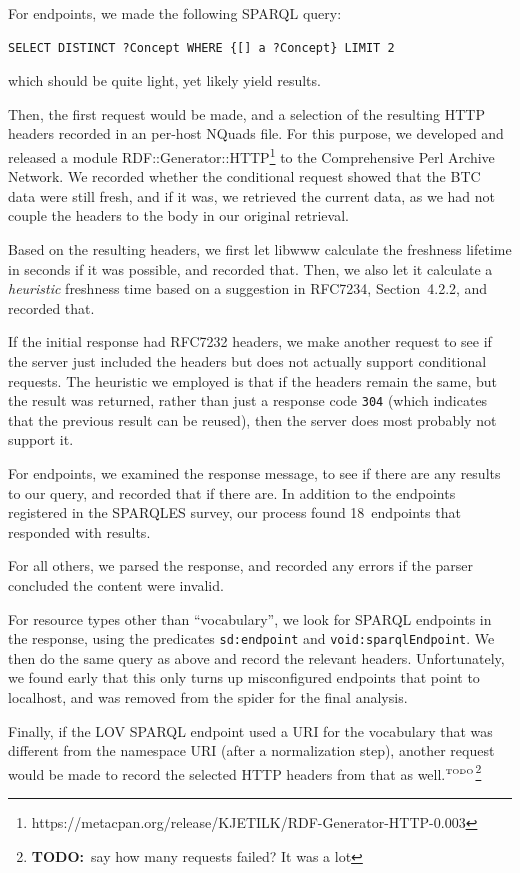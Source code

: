 \documentclass{llncs}
\newcommand{\rdfterm}[1]{\texttt{#1}}
\newcommand{\httph}[1]{\texttt{#1}}
\newcommand{\todo}[1]{\ensuremath{^{\textrm{\tiny{TODO}\normalsize}}}\footnote{\textbf{TODO:}~#1}}
\begin{document}
\begin{subappendices}
For endpoints, we made the following SPARQL query:
\begin{verbatim}
SELECT DISTINCT ?Concept WHERE {[] a ?Concept} LIMIT 2
\end{verbatim}
which should be quite light, yet likely yield results.

Then, the first request would be made, and a selection of the
resulting HTTP headers recorded in an per-host NQuads file. For this
purpose, we developed and released a module
RDF::Generator::HTTP\footnote{https://metacpan.org/release/KJETILK/RDF-Generator-HTTP-0.003}
to the Comprehensive Perl Archive Network. We recorded whether the
conditional request showed that the BTC data were still fresh, and if
it was, we retrieved the current data, as we had not couple the
headers to the body in our original retrieval.

Based on the resulting headers, we first let libwww calculate the
freshness lifetime in seconds if it was possible, and recorded
that. Then, we also let it calculate a \emph{heuristic} freshness
time based on a suggestion in RFC7234, Section~4.2.2, and recorded that.

If the initial response had RFC7232 headers, we make another
request to see if the server just included the headers but does not
actually support conditional requests. The heuristic we employed is
that if the headers remain the same, but the result was returned,
rather than just a response code \httph{304} (which indicates that the
previous result can be reused), then the server does most probably not
support it.

For endpoints, we examined the response message, to see if there are
any results to our query, and recorded that if there are. In addition
to the endpoints registered in the SPARQLES survey, our process found
18~endpoints that responded with results.

For all others, we parsed the response, and recorded any errors if the
parser concluded the content were invalid.

For resource types other than ``vocabulary'', we look for SPARQL
endpoints in the response, using the predicates \rdfterm{sd:endpoint}
and \rdfterm{void:sparqlEndpoint}. We then do the same query as above
and record the relevant headers. Unfortunately, we found early that
this only turns up misconfigured endpoints that point to localhost,
and was removed from the spider for the final analysis.

Finally, if the LOV SPARQL endpoint used a URI for the vocabulary that
was different from the namespace URI (after a normalization step),
another request would be made to record the selected HTTP headers from
that as well.\todo{say how many requests failed? It was a lot}
\end{subappendices}
\end{document}
